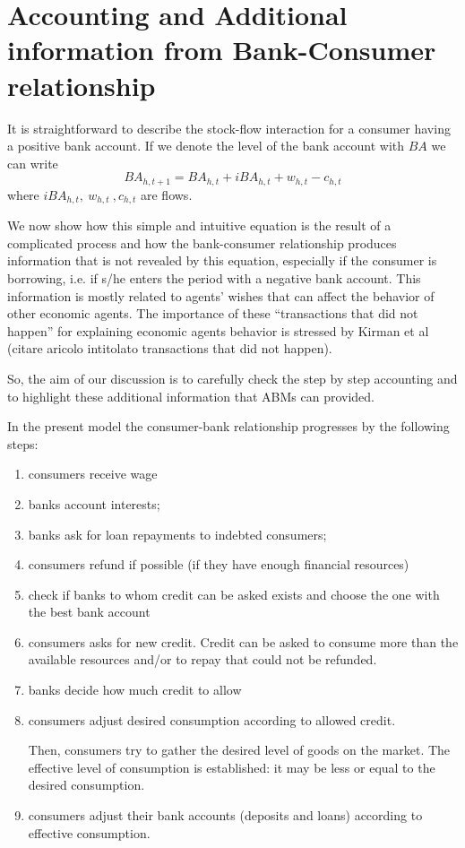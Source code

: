\documentclass{article}
\begin{document}

\section{Accounting and Additional information from Bank-Consumer relationship}

It is straightforward to describe the stock-flow interaction for a consumer having a positive bank account. If we denote the level of the bank account with $BA$ we can write
\begin{equation}
BA_{h,t+1}=BA_{h,t}+iBA_{h,t}+w_{h,t}-c_{h,t}
	\label{eq:ba_dyn}
\end{equation}
where $iBA_{h,t},\ w_{h,t}\ ,c_{h,t}$ are flows.

We now show how this simple and intuitive equation is the result of a complicated process and how 
the bank-consumer relationship produces information that is not revealed by this equation, especially if the consumer is borrowing, i.e. if s/he enters the period with a negative bank account. This information is mostly related to agents' wishes that can affect the behavior of other economic agents. The importance of these ``transactions that did not happen'' for explaining economic agents behavior is stressed by Kirman et al (citare aricolo intitolato transactions that did not happen).

So, the aim of our discussion is to carefully check the step by step accounting and to highlight these additional information that ABMs can provided.

In the present model the consumer-bank relationship progresses by the following steps:

\begin{enumerate}
	\item consumers receive wage
	\item banks account interests;
	\item banks ask for loan repayments to indebted consumers;
	\item consumers refund if possible (if they have enough financial resources)
	\item check if banks to whom credit can be asked exists and choose the one with the best bank account 
	\item consumers asks for new credit. Credit can be asked to consume more than the available resources and/or to repay that could not be refunded. 
	\item banks decide how much credit to allow
	\item consumers adjust desired consumption according to allowed credit. 
		
		Then, consumers try to gather the desired level of goods on the market. The effective level of consumption is established: it may be less or equal to the desired consumption.
	\item consumers adjust their bank accounts (deposits and loans) according to effective consumption.
\end{enumerate}
\end{document}

